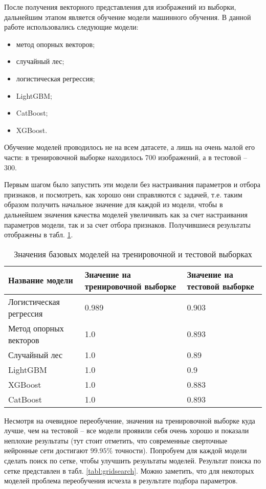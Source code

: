 После получения векторного представления для изображений из выборки, дальнейшим этапом является обучение модели машинного обучения. В данной работе использовались следующие модели:
\begin{itemize}
	\item метод опорных векторов;
	\item случайный лес;
	\item логистическая регрессия;
	\item LightGBM;
	\item CatBoost;
	\item XGBoost.
\end{itemize}

Обучение моделей проводилось не на всем датасете, а лишь на очень малой его части: в тренировочной выборке находилось 700 изображений, а в тестовой -- 300. 

Первым шагом было запустить эти модели без настраивания параметров и отбора признаков, и посмотреть, как хорошо они справляются с задачей, т.е. таким образом получить начальное значение для каждой из модели, чтобы в дальнейшем значения качества моделей увеличивать как за счет настраивания параметров модели, так и за счет отбора признаков. Получившиеся результаты отображены в табл. \ref{tabl:baselines}.

\begin{table}[!htbp]
	\centering
	\small
	\caption{Значения базовых моделей на тренировочной и тестовой выборках}	
	\begin{tabularx}{\linewidth}{|X|X|X|}
		\hline
		Название модели & Значение на тренировочной выборке & Значение на тестовой выборке\\ \hline
		Логистическая регрессия & 0.989 & 0.903 \\
		\hline 
		Метод опорных векторов & 1.0 & 0.893 \\
		\hline
		Случайный лес & 1.0 & 0.89 \\
		\hline
		LightGBM & 1.0 & 0.9 \\
		\hline
		XGBoost & 1.0 & 0.883 \\
		\hline
		CatBoost & 1.0 & 0.893 \\ 
		\hline
	\end{tabularx}
	\label{tabl:baselines}
\end{table}

Несмотря на очевидное переобучение, значения на тренировочной выборке куда лучше, чем на тестовой -- все модели проявили себя очень хорошо и показали неплохие результаты (тут стоит отметить, что современные сверточные нейронные сети достигают $99.95\%$ точности). Попробуем для каждой модели сделать поиск по сетке, чтобы улучшить результаты моделей. Результат поиска по сетке представлен в табл. \ref{tabl:gridsearch}. Можно заметить, что для некоторых моделей проблема переобучения исчезла в результате подбора параметров.

